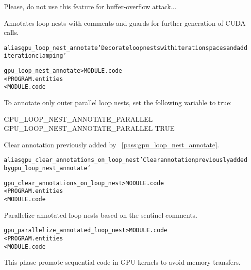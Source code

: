 \documentclass[a4paper]{report}
\newenvironment{PipsMake}{\begin{alltt}}{\end{alltt}}
\newcommand{\PipsPassRef}[1]{\texttt{\detokenize{#1}}~\ref{pass:#1}}
\newenvironment{PipsPass}[1]{\label{pass:#1}}{}
\begin{document}
Please, do not use this feature for buffer-overflow attack...



\begin{PipsPass}{gpu_loop_nest_annotate}
Annotates loop nests with comments and guards for further generation of CUDA calls.
\end{PipsPass}

\begin{PipsMake}
alias gpu_loop_nest_annotate 'Decorate loop nests with iteration spaces and add iteration clamping'

gpu_loop_nest_annotate	        > MODULE.code
        < PROGRAM.entities
        < MODULE.code

\end{PipsMake}

To annotate only outer parallel loop nests, set the following variable to true:
\begin{PipsProp}{GPU_LOOP_NEST_ANNOTATE_PARALLEL}
GPU_LOOP_NEST_ANNOTATE_PARALLEL TRUE
\end{PipsProp}



\begin{PipsPass}{gpu_clear_annotations_on_loop_nest}
Clear annotation previously added by \PipsPassRef{gpu_loop_nest_annotate}.
\end{PipsPass}

\begin{PipsMake}
alias gpu_clear_annotations_on_loop_nest 'Clear annotation previously added by gpu_loop_nest_annotate'

gpu_clear_annotations_on_loop_nest   > MODULE.code
        < PROGRAM.entities
        < MODULE.code
\end{PipsMake}



\begin{PipsPass}{gpu_parallelize_annotated_loop_nest}
Parallelize annotated loop nests based on the sentinel comments.
\end{PipsPass}

\begin{PipsMake}
gpu_parallelize_annotated_loop_nest        > MODULE.code
        < PROGRAM.entities
        < MODULE.code

\end{PipsMake}



\begin{PipsPass}{gpu_promote_sequential}
This phase promote sequential code in GPU kernels to avoid memory transfers.
\end{PipsPass}
\end{document}
